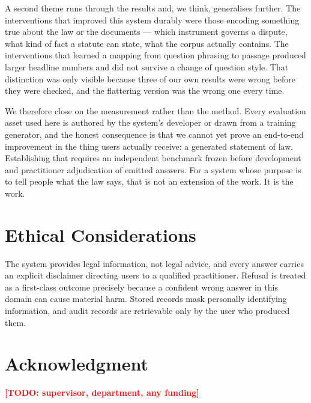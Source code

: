 \documentclass[conference]{IEEEtran}
\newcommand{\TODO}[1]{\textcolor{red}{\textbf{[TODO: #1]}}}
\begin{document}
A second theme runs through the results and, we think, generalises further. The
interventions that improved this system durably were those encoding something
true about the law or the documents --- which instrument governs a dispute, what
kind of fact a statute can state, what the corpus actually contains. The
interventions that learned a mapping from question phrasing to passage produced
larger headline numbers and did not survive a change of question style. That
distinction was only visible because three of our own results were wrong before
they were checked, and the flattering version was the wrong one every time.

We therefore close on the measurement rather than the method. Every evaluation
asset used here is authored by the system's developer or drawn from a training
generator, and the honest consequence is that we cannot yet prove an end-to-end
improvement in the thing users actually receive: a generated statement of law.
Establishing that requires an independent benchmark frozen before development
and practitioner adjudication of emitted answers. For a system whose purpose is
to tell people what the law says, that is not an extension of the work. It is
the work.

\section*{Ethical Considerations}
The system provides legal information, not legal advice, and every answer
carries an explicit disclaimer directing users to a qualified practitioner.
Refusal is treated as a first-class outcome precisely because a confident wrong
answer in this domain can cause material harm. Stored records mask personally
identifying information, and audit records are retrievable only by the user who
produced them.

\section*{Acknowledgment}
\TODO{supervisor, department, any funding}



\end{document}
